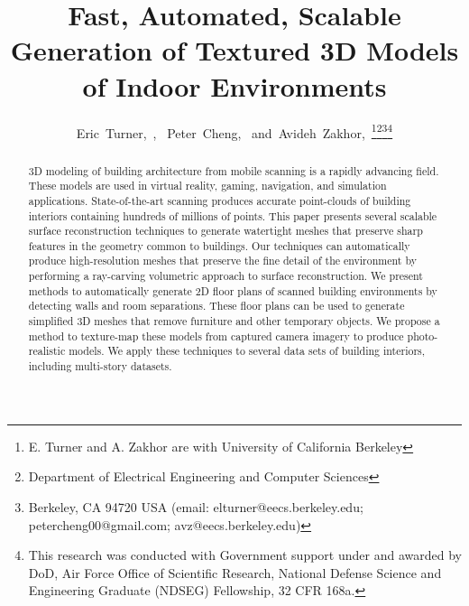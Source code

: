 \documentclass[10pt,twocolumn,twoside]{IEEEtran}
\begin{document}
\title{Fast, Automated, Scalable Generation of Textured 3D Models of Indoor Environments}

%

\author{Eric~Turner,~, ~Peter~Cheng, ~and~Avideh~Zakhor,~\thanks{E. Turner and A. Zakhor are with University of California Berkeley}\thanks{Department of Electrical Engineering and Computer Sciences}\thanks{Berkeley, CA 94720 USA (email: elturner@eecs.berkeley.edu; petercheng00@gmail.com; avz@eecs.berkeley.edu)}\thanks{This research was conducted with Government support under and awarded by DoD, Air Force Office of Scientific Research, National Defense Science and Engineering Graduate (NDSEG) Fellowship, 32 CFR 168a. }}

\maketitle

\begin{abstract}

3D modeling of building architecture from mobile scanning is a rapidly advancing field.  These models are used in virtual reality, gaming, navigation, and simulation applications.  State-of-the-art scanning produces accurate point-clouds of building interiors containing hundreds of millions of points.  This paper presents several scalable surface reconstruction techniques to generate watertight meshes that preserve sharp features in the geometry common to buildings.  Our techniques can automatically produce high-resolution meshes that preserve the fine detail of the environment by performing a ray-carving volumetric approach to surface reconstruction.  We present methods to automatically generate 2D floor plans of scanned building environments by detecting walls and room separations.  These floor plans can be used to generate simplified 3D meshes that remove furniture and other temporary objects.  We propose a method to texture-map these models from captured camera imagery to produce photo-realistic models.  We apply these techniques to several data sets of building interiors, including multi-story datasets.

\end{abstract}
\end{document}
